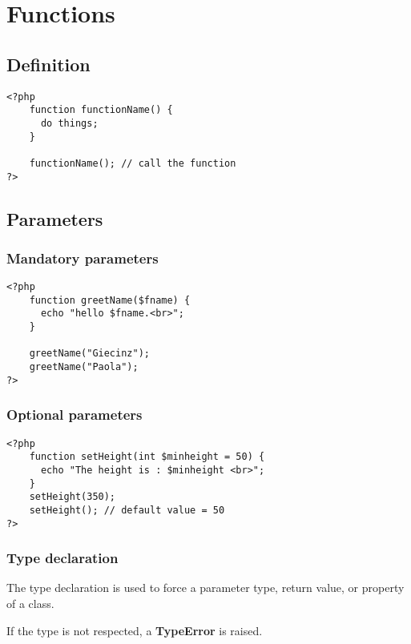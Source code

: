 \documentclass{article}
\begin{document}
\pagebreak

\section{Functions}

\subsection{Definition}

\begin{lstlisting}
<?php
    function functionName() {
      do things;
    }
    
    functionName(); // call the function
?>
\end{lstlisting}

\subsection{Parameters}

\subsubsection{Mandatory parameters}

\begin{lstlisting}
<?php
    function greetName($fname) {
      echo "hello $fname.<br>";
    }
    
    greetName("Giecinz");
    greetName("Paola");
?>
\end{lstlisting}

\subsubsection{Optional parameters}

\begin{lstlisting}
<?php
    function setHeight(int $minheight = 50) {
      echo "The height is : $minheight <br>";
    }
    setHeight(350);
    setHeight(); // default value = 50
?>
\end{lstlisting}

\subsubsection{Type declaration}

The type declaration is used to force a parameter type, return value,
or property of a class. 

If the type is not respected, a \textbf{TypeError} is raised.
\end{document}
